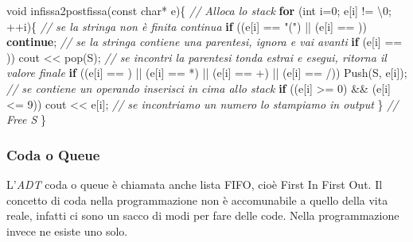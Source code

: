\documentclass[
]{article}
\newenvironment{Shaded}{}{}
\newcommand{\AttributeTok}[1]{\textcolor[rgb]{0.49,0.56,0.16}{#1}}
\newcommand{\CharTok}[1]{\textcolor[rgb]{0.25,0.44,0.63}{#1}}
\newcommand{\CommentTok}[1]{\textcolor[rgb]{0.38,0.63,0.69}{\textit{#1}}}
\newcommand{\ControlFlowTok}[1]{\textcolor[rgb]{0.00,0.44,0.13}{\textbf{#1}}}
\newcommand{\DataTypeTok}[1]{\textcolor[rgb]{0.56,0.13,0.00}{#1}}
\newcommand{\DecValTok}[1]{\textcolor[rgb]{0.25,0.63,0.44}{#1}}
\newcommand{\NormalTok}[1]{#1}
\newcommand{\SpecialCharTok}[1]{\textcolor[rgb]{0.25,0.44,0.63}{#1}}
\newcommand{\StringTok}[1]{\textcolor[rgb]{0.25,0.44,0.63}{#1}}
\begin{document}
\begin{Shaded}
\begin{Highlighting}[]
\DataTypeTok{void}\NormalTok{ infissa2postfissa(}\AttributeTok{const} \DataTypeTok{char}\NormalTok{* e)\{}
    \CommentTok{// Alloca lo stack}
    \ControlFlowTok{for}\NormalTok{ (}\DataTypeTok{int}\NormalTok{ i=}\DecValTok{0}\NormalTok{; e[i] != }\CharTok{\textquotesingle{}}\SpecialCharTok{\textbackslash{}0}\CharTok{\textquotesingle{}}\NormalTok{; ++i)\{ }\CommentTok{// se la stringa non è finita continua}
        \ControlFlowTok{if}\NormalTok{ ((e[i] == }\StringTok{"("}\NormalTok{) || (e[i] == }\CharTok{\textquotesingle{} \textquotesingle{}}\NormalTok{)) }\ControlFlowTok{continue}\NormalTok{;}
        \CommentTok{// se la stringa contiene una parentesi, ignora e vai avanti}
        \ControlFlowTok{if}\NormalTok{ (e[i] == }\CharTok{\textquotesingle{})\textquotesingle{}}\NormalTok{)}
\NormalTok{            cout \textless{}\textless{} pop(S);}
        \CommentTok{// se incontri la parentesi tonda estrai e esegui, ritorna il valore finale}
        \ControlFlowTok{if}\NormalTok{ ((e[i] == }\CharTok{\textquotesingle{}{-}\textquotesingle{}}\NormalTok{) || (e[i] == }\CharTok{\textquotesingle{}*\textquotesingle{}}\NormalTok{) || (e[i] == }\CharTok{\textquotesingle{}+\textquotesingle{}}\NormalTok{)}
\NormalTok{           					|| (e[i] == }\CharTok{\textquotesingle{}/\textquotesingle{}}\NormalTok{))}
\NormalTok{            Push(S, e[i]);}
        \CommentTok{// se contiene un operando inserisci in cima allo stack}
        \ControlFlowTok{if}\NormalTok{ ((e[i] \textgreater{}= }\CharTok{\textquotesingle{}0\textquotesingle{}}\NormalTok{) \&\& (e[i] \textless{}= }\CharTok{\textquotesingle{}9\textquotesingle{}}\NormalTok{))}
\NormalTok{            cout \textless{}\textless{} e[i];}
        \CommentTok{// se incontriamo un numero lo stampiamo in output}
\NormalTok{    \}}
	\CommentTok{// Free S}
\NormalTok{\}}
\end{Highlighting}
\end{Shaded}

\hypertarget{header-n1412}{%
\subsubsection{Coda o Queue}\label{header-n1412}}

L'\emph{ADT} coda o queue è chiamata anche lista FIFO, cioè First In
First Out. Il concetto di coda nella programmazione non è accomunabile a
quello della vita reale, infatti ci sono un sacco di modi per fare delle
code. Nella programmazione invece ne esiste uno solo.
\end{document}
